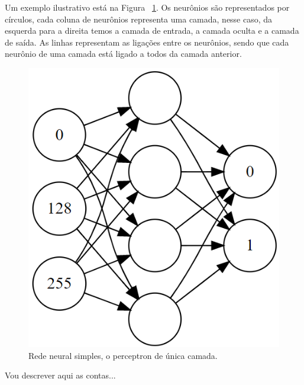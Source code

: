 Um exemplo ilustrativo está na Figura ~\ref{fig:perceptron}. Os neurônios são representados por círculos, cada coluna de neurônios representa uma camada, nesse caso, da esquerda para a direita temos a camada de entrada, a camada oculta e a camada de saída. As linhas representam as ligações entre os neurônios, sendo que cada neurônio de uma camada está ligado a todos da camada anterior.

\begin{figure}[htb]
\centering
\includegraphics[width=12cm]{figuras/perceptron}
\caption{\label{fig:perceptron}Rede neural simples, o perceptron de única camada. }
\end{figure}

Vou descrever aqui as contas...